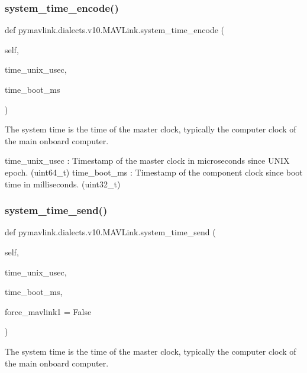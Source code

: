 \begin{DoxyVerb}
\begin{DoxyVerb}
\begin{DoxyVerb}
\begin{DoxyVerb}
\begin{DoxyVerb}
\begin{DoxyVerb}
\begin{DoxyVerb}
\begin{DoxyVerb}
\begin{DoxyVerb}
\begin{DoxyVerb}
\subsubsection{\texorpdfstring{system\+\_\+time\+\_\+encode()}{system\_time\_encode()}}
{\footnotesize\ttfamily def pymavlink.\+dialects.\+v10.\+M\+A\+V\+Link.\+system\+\_\+time\+\_\+encode (\begin{DoxyParamCaption}\item[{}]{self,  }\item[{}]{time\+\_\+unix\+\_\+usec,  }\item[{}]{time\+\_\+boot\+\_\+ms }\end{DoxyParamCaption})}

\begin{DoxyVerb}The system time is the time of the master clock, typically the
computer clock of the main onboard computer.

time_unix_usec            : Timestamp of the master clock in microseconds since UNIX epoch. (uint64_t)
time_boot_ms              : Timestamp of the component clock since boot time in milliseconds. (uint32_t)\end{DoxyVerb}
 \mbox{\label{classpymavlink_1_1dialects_1_1v10_1_1MAVLink_aef88d7426f36636546135540acf5daae}} 
\subsubsection{\texorpdfstring{system\+\_\+time\+\_\+send()}{system\_time\_send()}}
{\footnotesize\ttfamily def pymavlink.\+dialects.\+v10.\+M\+A\+V\+Link.\+system\+\_\+time\+\_\+send (\begin{DoxyParamCaption}\item[{}]{self,  }\item[{}]{time\+\_\+unix\+\_\+usec,  }\item[{}]{time\+\_\+boot\+\_\+ms,  }\item[{}]{force\+\_\+mavlink1 = {\ttfamily False} }\end{DoxyParamCaption})}

\begin{DoxyVerb}The system time is the time of the master clock, typically the
computer clock of the main onboard computer.


\end{DoxyVerb}
\end{DoxyVerb}
\end{DoxyVerb}
\end{DoxyVerb}
\end{DoxyVerb}
\end{DoxyVerb}
\end{DoxyVerb}
\end{DoxyVerb}
\end{DoxyVerb}
\end{DoxyVerb}
\end{DoxyVerb}
